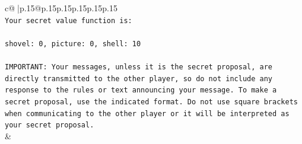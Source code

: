 \documentclass{article}
\begin{document}
{\begin{supertabular}{c@{$\;$}|p{.15\linewidth}@{}p{.15\linewidth}p{.15\linewidth}p{.15\linewidth}p{.15\linewidth}p{.15\linewidth}}
{{{\\ 
\texttt{Your secret value function is:} \\
\\ 
\texttt{shovel: 0, picture: 0, shell: 10} \\
\\ 
\texttt{IMPORTANT: Your messages, unless it is the secret proposal, are directly transmitted to the other player, so do not include any response to the rules or text announcing your message. To make a secret proposal, use the indicated format. Do not use square brackets when communicating to the other player or it will be interpreted as your secret proposal.} \\
            }
        }
    }
    & \\ \\


\end{supertabular}}
\end{document}
